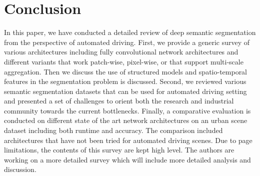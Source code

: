 \documentclass[conference]{IEEEtran}
\begin{document}
\section{Conclusion}\label{sec:conc}
In this paper, we have conducted a detailed review of deep semantic segmentation from the perspective of automated driving. First, we provide a generic survey of various architectures including fully convolutional network architectures and different variants that work patch-wise, pixel-wise, or that support multi-scale aggregation. Then we discuss the use of structured models and spatio-temporal features in the segmentation problem is discussed. Second, we reviewed various semantic segmentation datasets that can be used for automated driving setting and presented a set of challenges to orient both the research and industrial community towards the current bottlenecks. Finally, a comparative evaluation is conducted on different state of the art network architectures on an urban scene dataset including both runtime and accuracy. The comparison included architectures that have not been tried for automated driving scenes. Due to page limitations, the contents of this survey are kept high level. The authors are working on a more detailed survey which will include more detailed  analysis and discussion.



\end{document}
